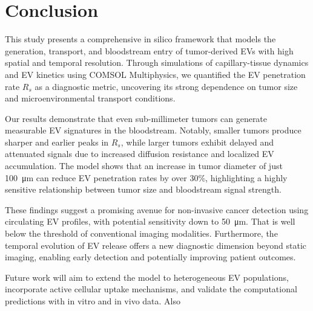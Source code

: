 \documentclass[sigconf]{acmart}
\begin{document}
\section{Conclusion}
\label{sec: conclusion}
This study presents a comprehensive in silico framework that models the generation, transport, and bloodstream entry of tumor-derived EVs with high spatial and temporal resolution. Through simulations of capillary-tissue dynamics and EV kinetics using COMSOL Multiphysics, we quantified the EV penetration rate $R_s$ as a diagnostic metric, uncovering its strong dependence on tumor size and microenvironmental transport conditions.

Our results demonstrate that even sub-millimeter tumors can generate measurable EV signatures in the bloodstream. Notably, smaller tumors produce sharper and earlier peaks in $R_s$, while larger tumors exhibit delayed and attenuated signals due to increased diffusion resistance and localized EV accumulation. The model shows that an increase in tumor diameter of just 100~\si{\micro\meter} can reduce EV penetration rates by over 30\%, highlighting a highly sensitive relationship between tumor size and bloodstream signal strength.

These findings suggest a promising avenue for non-invasive cancer detection using circulating EV profiles, with potential sensitivity down to 50~\si{\micro\meter}. That is well below the threshold of conventional imaging modalities. Furthermore, the temporal evolution of EV release offers a new diagnostic dimension beyond static imaging, enabling early detection and potentially improving patient outcomes.

Future work will aim to extend the model to heterogeneous EV populations, incorporate active cellular uptake mechanisms, and validate the computational predictions with in vitro and in vivo data. Also 



\end{document}
